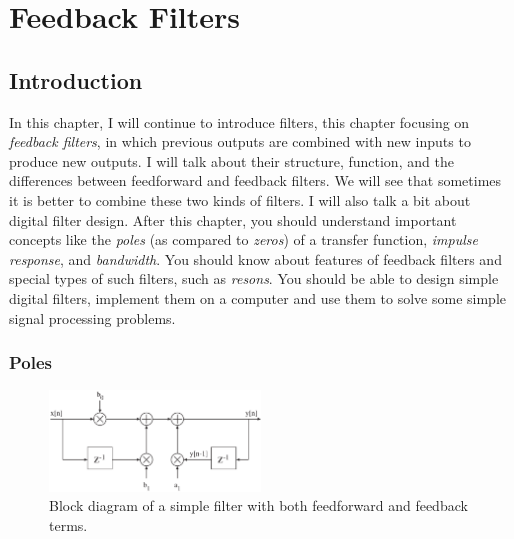 
%
%
%
%
%
%
%

\chapter{Feedback Filters}
\label{ch:fb-filters}

\section{Introduction}

In this chapter, I will continue to introduce filters, this chapter
focusing on \emph{feedback filters}, in which previous outputs are
combined with new inputs to produce new outputs. I will talk about
their structure, function, and the differences between feedforward and
feedback filters.  We will see that sometimes it is better to combine
these two kinds of filters. I will also talk a bit about digital
filter design. After this chapter, you should understand important
concepts like the \emph{poles} (as compared to \emph{zeros}) of a
transfer function, \emph{impulse response}, and \emph{bandwidth}. You
should know about features of feedback filters and special types of
such filters, such as \emph{resons}.  You should be able to design
simple digital filters, implement them on a computer and use them to
solve some simple signal processing problems.

\subsection{Poles}

\begin{figure}
\centerline{\includegraphics[width=0.5\textwidth]{ch-iir/fb-bdiag}}
\caption{Block diagram of a simple filter with both feedforward and
  feedback terms.\label{fig:fb-bdiag}}
\end{figure}

